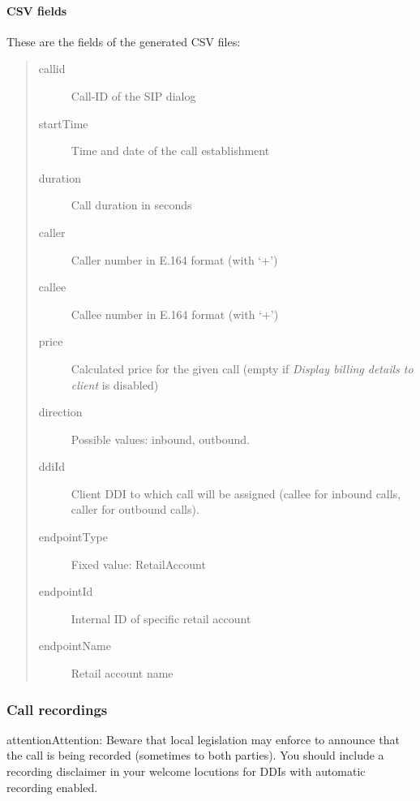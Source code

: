 \documentclass[letterpaper,10pt,english]{sphinxmanual}
\begin{document}
\paragraph{CSV fields}
\label{administration_portal/client/retail/calls/call_csv_schedulers:csv-fields}
These are the fields of the generated CSV files:
\begin{quote}
\begin{description}
\item[{callid}] \leavevmode
Call-ID of the SIP dialog

\item[{startTime}] \leavevmode
Time and date of the call establishment

\item[{duration}] \leavevmode
Call duration in seconds

\item[{caller}] \leavevmode
Caller number in E.164 format (with `+')

\item[{callee}] \leavevmode
Callee number in E.164 format (with `+')

\item[{price}] \leavevmode
Calculated price for the given call (empty if \emph{Display billing details to client} is disabled)

\item[{direction}] \leavevmode
Possible values: inbound, outbound.

\item[{ddiId}] \leavevmode
Client DDI to which call will be assigned (callee for inbound calls, caller for outbound calls).

\item[{endpointType}] \leavevmode
Fixed value: RetailAccount

\item[{endpointId}] \leavevmode
Internal ID of specific retail account

\item[{endpointName}] \leavevmode
Retail account name

\end{description}
\end{quote}


\subsubsection{Call recordings}
\label{administration_portal/client/retail/calls/call_recordings::doc}\label{administration_portal/client/retail/calls/call_recordings:call-recordings}
\begin{notice}{attention}{Attention:}
Beware that local legislation may enforce to announce that the
call is being recorded (sometimes to both parties). You should include
a recording disclaimer in your welcome locutions for DDIs with automatic
recording enabled.
\end{notice}
\end{document}

